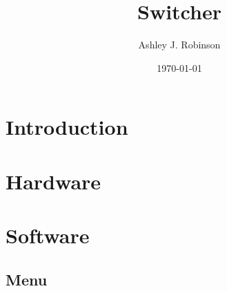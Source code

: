 \documentclass[12pt]{article}%
\begin{document}
\title{Switcher}
\author{Ashley J. Robinson}
\date{\today}
\maketitle
\section{Introduction}


\section{Hardware}


\section{Software}



\subsection{Menu}

       
\end{document}
